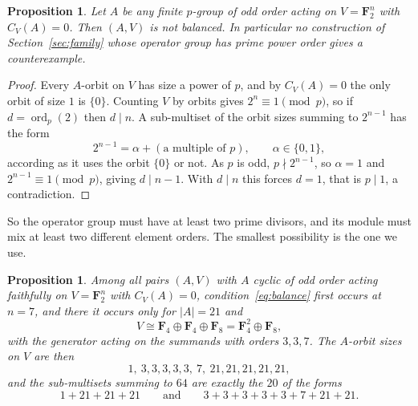 \documentclass[11pt,a4paper,reqno]{amsart}
\newtheorem{proposition}[theorem]{Proposition}
\theoremstyle{definition}
\theoremstyle{remark}
\newcommand{\F}{\mathbf F}
\begin{document}
\begin{proposition}\label{prop:prime-fails}
Let $A$ be any finite $p$-group of odd order acting on $V=\F_2^n$ with
$C_V(A)=0$.  Then $(A,V)$ is not balanced.  In particular no
construction of Section~\ref{sec:family} whose operator group has prime
power order gives a counterexample.
\end{proposition}

\begin{proof}
Every $A$-orbit on $V$ has size a power of $p$, and by
$C_V(A)=0$ the only orbit of size $1$ is $\{0\}$.  Counting $V$ by
orbits gives $2^n\equiv1\pmod p$, so if $d=\operatorname{ord}_p(2)$ then
$d\mid n$.  A sub-multiset of the orbit sizes summing to $2^{n-1}$ has
the form
\[
 2^{n-1}=\alpha+(\text{a multiple of }p),
 \qquad\alpha\in\{0,1\},
\]
according as it uses the orbit $\{0\}$ or not.  As $p$ is odd,
$p\nmid2^{n-1}$, so $\alpha=1$ and $2^{n-1}\equiv1\pmod p$, giving
$d\mid n-1$.  With $d\mid n$ this forces $d=1$, that is $p\mid1$, a
contradiction.
\end{proof}

So the operator group must have at least two prime divisors, and its
module must mix at least two different element orders.  The smallest
possibility is the one we use.

\begin{proposition}\label{prop:minimal}
Among all pairs $(A,V)$ with $A$ \emph{cyclic} of odd order acting
faithfully on $V=\F_2^n$ with $C_V(A)=0$, condition~\eqref{eq:balance}
first
occurs at $n=7$, and there it occurs only for $|A|=21$ and
\[
 V\cong\F_4\oplus\F_4\oplus\F_8=\F_4^2\oplus\F_8 ,
\]
with the generator acting on the summands with orders $3,3,7$.  The
$A$-orbit sizes on $V$ are then
\[
 1,\ 3,3,3,3,3,\ 7,\ 21,21,21,21,21,
\]
and the sub-multisets summing to $64$ are exactly the $20$ of the forms
\[
 1+21+21+21
 \qquad\text{and}\qquad
 3+3+3+3+3+7+21+21 .
\]
\end{proposition}
\end{document}
